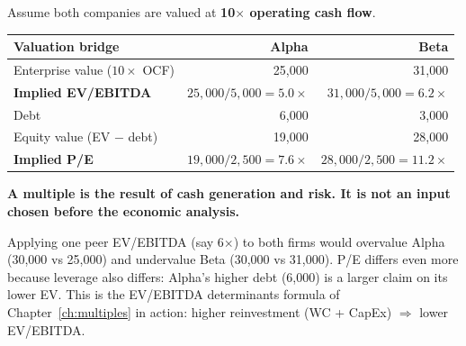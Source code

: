 \begin{exbox}
Assume both companies are valued at \textbf{10$\times$ operating cash flow}.
\begin{center}
\begin{tabular}{@{}lrr@{}}
\toprule
\textbf{Valuation bridge} & \textbf{Alpha} & \textbf{Beta}\\
\midrule
Enterprise value ($10\times$ OCF) & 25,000 & 31,000\\
\textbf{Implied EV/EBITDA} & $25{,}000/5{,}000=\mathbf{5.0\times}$ & $31{,}000/5{,}000=\mathbf{6.2\times}$\\
Debt & 6,000 & 3,000\\
Equity value (EV $-$ debt) & 19,000 & 28,000\\
\textbf{Implied P/E} & $19{,}000/2{,}500=\mathbf{7.6\times}$ & $28{,}000/2{,}500=\mathbf{11.2\times}$\\
\bottomrule
\end{tabular}
\end{center}
\textbf{A multiple is the result of cash generation and risk. It is not an input chosen before the economic analysis.}
\end{exbox}
\begin{addbox}
Applying one peer EV/EBITDA (say 6$\times$) to both firms would overvalue Alpha (30,000 vs 25,000) and undervalue Beta (30,000 vs 31,000). P/E differs even more because leverage also differs: Alpha's higher debt (6,000) is a larger claim on its lower EV. This is the EV/EBITDA determinants formula of Chapter~\ref{ch:multiples} in action: higher reinvestment (WC + CapEx) $\Rightarrow$ lower EV/EBITDA.
\end{addbox}

